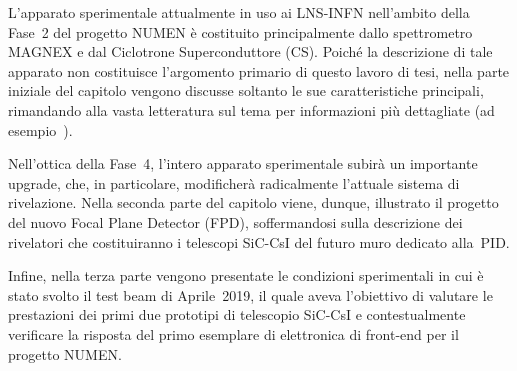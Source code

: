 

L'apparato sperimentale attualmente in uso ai LNS-INFN nell'ambito della Fase~2 del progetto NUMEN è costituito principalmente dallo spettrometro MAGNEX e dal Ciclotrone Superconduttore (CS).
Poiché la descrizione di tale apparato non costituisce l'argomento primario di questo lavoro di tesi, nella parte iniziale del capitolo vengono discusse soltanto le sue caratteristiche principali, rimandando alla vasta letteratura sul tema per informazioni più dettagliate (ad esempio~\cite{cavallaro:epja12, carbone:epja12, cappuzzello:epja16, cunsolo:epjst07}).

Nell'ottica della Fase~4, l'intero apparato sperimentale subirà un importante upgrade, che, in particolare, modificherà radicalmente l'attuale sistema di rivelazione.
Nella seconda parte del capitolo viene, dunque, illustrato il progetto del nuovo Focal Plane Detector (FPD), soffermandosi sulla descrizione dei rivelatori che costituiranno i telescopi SiC-CsI del futuro muro dedicato alla~PID.


Infine, nella terza parte vengono presentate le condizioni sperimentali in cui è stato svolto il test beam di Aprile~2019, il quale aveva l'obiettivo di valutare le prestazioni dei primi due prototipi di telescopio SiC-CsI e contestualmente verificare la risposta del primo esemplare di elettronica di front-end per il progetto NUMEN.



